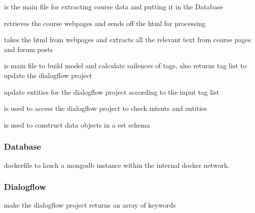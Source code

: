  is the main file for extracting course data and putting it in the Database

 retrieves the course webpages and sends off the html for processing

 takes the html from webpages and extracts all the relevant text from course pages and forum posts

 is main file to build model and calculate sailences of tags, also returns tag list to update the dialogflow project 

 update entities for the dialogflow project according to the input tag list

 is used to access the dialogflow project to check intents and entities

 is used to construct data objects in a set schema

\subsubsection{Database}

 dockerfile to lauch a mongodb instance within the internal docker network.

\subsubsection{Dialogflow}

 make the dialogflow project returns an array of keywords

